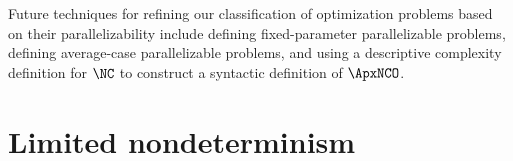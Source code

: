 \documentclass{article}
\begin{document}

Future techniques for refining our classification of optimization problems based on their parallelizability include defining fixed-parameter parallelizable problems, defining average-case parallelizable problems, and using a descriptive complexity definition for $\NC$ to construct a syntactic definition of $\ApxNCO$.

\section{Limited nondeterminism}







%


\end{document}
